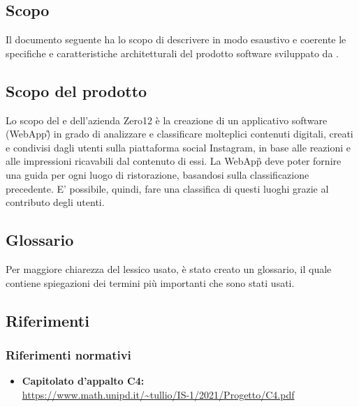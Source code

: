 \subsection{Scopo}
Il documento seguente ha lo scopo di descrivere in modo esaustivo e coerente le specifiche e caratteristiche architetturali del prodotto software sviluppato da \teamname{}.

\subsection{Scopo del prodotto}
Lo scopo del \teamname{} e dell'azienda Zero12 è la creazione di un applicativo software (WebApp){\G} in grado di analizzare e 
classificare molteplici contenuti digitali, creati e condivisi dagli utenti sulla piattaforma social Instagram, in base alle reazioni e alle impressioni ricavabili dal contenuto di essi. 
La WebApp{\G} deve poter fornire una guida per ogni luogo di ristorazione, basandosi sulla classificazione precedente. 
E' possibile, quindi, fare una classifica di questi luoghi grazie al contributo degli utenti.

\subsection{Glossario}
Per maggiore chiarezza del lessico usato, è stato creato un glossario, il quale 
contiene spiegazioni dei termini più importanti che sono stati usati.

\subsection{Riferimenti}
\subsubsection{Riferimenti normativi}
\begin{itemize}
	\item
	{\textbf{Capitolato d'appalto C4:}}\\\url{https://www.math.unipd.it/~tullio/IS-1/2021/Progetto/C4.pdf}
    
\end{itemize}
